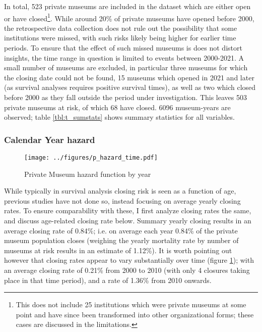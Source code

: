 \documentclass[12pt]{article}
\begin{document}
In total, 523 private museums are included in the dataset which are either open or have closed\footnote{This does not include 25 institutions which were private museums at some point and have since been transformed into other organizational forms; these cases are discussed in the limitations.}.
While around 20\% of private museums have opened before 2000, the retrospective data collection does not rule out the possibility that some institutions were missed, with such risks likely being higher for earlier time periods.
To ensure that the effect of such missed museums is does not distort insights, the time range in question is limited to events between 2000-2021.
A small number of museums are excluded, in particular three museums for which the closing date could not be found, 15 museums which opened in 2021 and later (as survival analyses requires positive survival times), as well as two which closed before 2000 as they fall outside the period under investigation.
This leaves 503 private museums at risk, of which 68 have closed.
6096 museum-years are observed; table \ref{tbl:t_sumstats} shows summary statistics for all variables.
\subsubsection*{Calendar Year hazard}

\begin{figure}[htbp]
\centering
\texttt{[image: ../figures/p\_hazard\_time.pdf]}
\caption{\label{fig:p_hazard_time}Private Museum hazard function by year}
\end{figure}

While typically in survival analysis closing risk is seen as a function of age, previous studies have not done so, instead focusing on average yearly closing rates.
To ensure comparability with these, I first analyze closing rates the same, and discuss age-related closing rate below.
Summary yearly closing results in an average closing rate of 0.84\%; i.e. on average each year 0.84\% of the private museum population closes (weighing the yearly mortality rate by number of museums at risk results in an estimate of 1.12\%).
It is worth pointing out however that closing rates appear to vary substantially over time (figure \ref{fig:p_hazard_time}); with an average closing rate of 0.21\% from 2000 to 2010 (with only 4 closures taking place in that time period), and a rate of 1.36\% from 2010 onwards.
\end{document}
